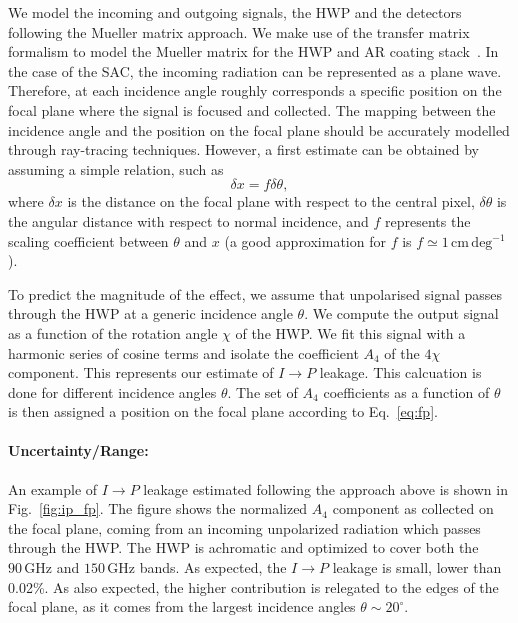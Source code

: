 We model the incoming and outgoing signals, the HWP and the detectors following the Mueller matrix approach. We make use of the transfer matrix formalism to model the Mueller matrix for the HWP and AR coating stack~\cite{Tom_TM}. In the case of the SAC, the incoming radiation can be represented as a plane wave. Therefore, at each incidence angle roughly corresponds a specific position on the focal plane where the signal is focused and collected. The mapping between the incidence angle and the position on the focal plane should be accurately modelled through ray-tracing techniques. However, a first estimate can be obtained by assuming a simple relation, such as 
\begin{equation}\label{eq:fp}
\delta x= f \delta \theta,
\end{equation}
where $\delta x$ is the distance on the focal plane with respect to the central pixel, $\delta \theta$ is the angular distance with respect to normal incidence, and $f$ represents the scaling coefficient between $\theta$ and $x$ (a good approximation for $f$ is $f\simeq 1\,\mathrm{cm\,deg^{-1}}$).

To predict the magnitude of the effect, we assume that unpolarised signal passes through the HWP at a generic incidence angle $\theta$. We compute the output signal as a function of the rotation angle $\chi$ of the HWP. We fit this signal with a harmonic series of cosine terms and isolate the coefficient $A_4$ of the $4\chi$ component. This represents our estimate of $I\rightarrow P$ leakage. This calcuation is done for different incidence angles $\theta$. The set of $A_4$ coefficients as a function of $\theta$ is then assigned a position on the focal plane according to Eq.~\ref{eq:fp}.

\paragraph{Uncertainty/Range:}
An example of $I\rightarrow P$ leakage estimated following the approach above is shown in Fig.~\ref{fig:ip_fp}. The figure shows the normalized $A_4$ component as collected on the focal plane, coming from an incoming unpolarized radiation which passes through the HWP. The HWP is achromatic and optimized to cover both the $90\,\mathrm{GHz}$ and $150\,\mathrm{GHz}$ bands. As expected, the $I\rightarrow P$ leakage is small, lower than 0.02\%. As also expected, the higher contribution is relegated to the edges of the focal plane, as it comes from the largest incidence angles $\theta\sim 20^\circ$.

